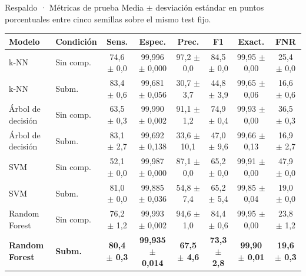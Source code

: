 \documentclass[aspectratio=169,10pt]{beamer}
\begin{document}
\begin{frame}{Respaldo · Métricas de prueba}
  \centering\scriptsize Media $\pm$ desviación estándar en puntos porcentuales entre cinco semillas sobre el mismo test fijo.
  \vspace{0.3cm}

  {\scriptsize
  \setlength{\tabcolsep}{3.7pt}
  \begin{tabular}{>{\raggedright\arraybackslash}p{2.0cm} >{\raggedright\arraybackslash}p{1.2cm} c c c c c c}
    \rowcolor{FraudPaleBlue}
    \toprule
    \textbf{Modelo} & \textbf{Condición} & \textbf{Sens.} & \textbf{Espec.} & \textbf{Prec.} & \textbf{F1} & \textbf{Exact.} & \textbf{FNR} \\
    \midrule
    k-NN & Sin comp. & 74,6 $\pm$ 0,0 & 99,996 $\pm$ 0,000 & 97,2 $\pm$ 0,0 & 84,5 $\pm$ 0,0 & 99,95 $\pm$ 0,00 & 25,4 $\pm$ 0,0 \\
    \rowcolor{FraudLightGray}
    k-NN & Subm. & 83,4 $\pm$ 0,6 & 99,681 $\pm$ 0,056 & 30,7 $\pm$ 3,7 & 44,8 $\pm$ 3,9 & 99,65 $\pm$ 0,06 & 16,6 $\pm$ 0,6 \\
    Árbol de decisión & Sin comp. & 63,5 $\pm$ 0,3 & 99,990 $\pm$ 0,002 & 91,1 $\pm$ 1,2 & 74,9 $\pm$ 0,4 & 99,93 $\pm$ 0,00 & 36,5 $\pm$ 0,3 \\
    \rowcolor{FraudLightGray}
    Árbol de decisión & Subm. & 83,1 $\pm$ 2,7 & 99,692 $\pm$ 0,138 & 33,6 $\pm$ 10,1 & 47,0 $\pm$ 9,6 & 99,66 $\pm$ 0,13 & 16,9 $\pm$ 2,7 \\
    SVM & Sin comp. & 52,1 $\pm$ 0,0 & 99,987 $\pm$ 0,000 & 87,1 $\pm$ 0,0 & 65,2 $\pm$ 0,0 & 99,91 $\pm$ 0,00 & 47,9 $\pm$ 0,0 \\
    \rowcolor{FraudLightGray}
    SVM & Subm. & 81,0 $\pm$ 0,0 & 99,885 $\pm$ 0,036 & 54,8 $\pm$ 7,4 & 65,2 $\pm$ 5,4 & 99,85 $\pm$ 0,04 & 19,0 $\pm$ 0,0 \\
    Random Forest & Sin comp. & 76,2 $\pm$ 1,2 & 99,993 $\pm$ 0,002 & 94,6 $\pm$ 1,0 & 84,4 $\pm$ 0,6 & 99,95 $\pm$ 0,00 & 23,8 $\pm$ 1,2 \\
    \rowcolor{FraudPaleBlue}\textbf{Random Forest} & \textbf{Subm.} & \textbf{80,4 $\pm$ 0,3} & \textbf{99,935 $\pm$ 0,014} & \textbf{67,5 $\pm$ 4,6} & \textbf{73,3 $\pm$ 2,8} & \textbf{99,90 $\pm$ 0,01} & \textbf{19,6 $\pm$ 0,3} \\
    \bottomrule
  \end{tabular}}
\end{frame}
\end{document}

